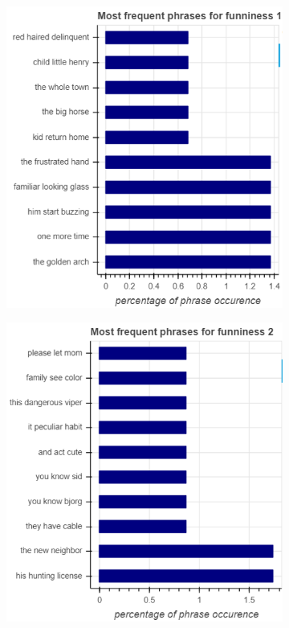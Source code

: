 \documentclass[draft,final,oneside]{vutinfth} %
\begin{document}
\begin{figure}
\centering

\begin{subfigure}[b]{0.45\textwidth}
\centering
\includegraphics[width=1.0\textwidth]{graphics/phrases/funniness_1}
\end{subfigure}\quad
\begin{subfigure}[b]{0.45\textwidth}
\centering
\includegraphics[width=1.0\textwidth]{graphics/phrases/funniness_2}
\end{subfigure}


\end{figure}
\end{document}
